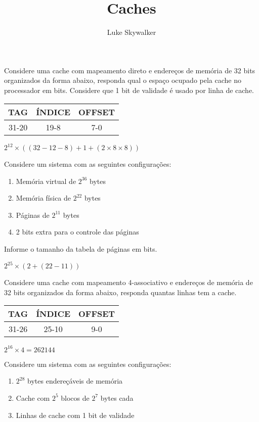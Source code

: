 \documentclass{article}
\author{Luke Skywalker}
\title{Caches}
\begin{document}
\maketitle

Considere uma cache com mapeamento direto e endereços de memória de 32 bits 
organizados da forma abaixo, responda qual o espaço ocupado pela cache no 
processador em bits. Considere que 1 bit de validade é usado por linha de cache.

\begin{tabular}{|c|c|c|}
\hline TAG & ÍNDICE & OFFSET \\
\hline 31-20 & 19-8 & 7-0 \\
\hline
\end{tabular}

$2^{12}\times((32-12-8)+1+(2\times8\times8))$

Considere um sistema com as seguintes configurações:

\begin{enumerate}
\item Memória virtual de $2^36$ bytes
\item Memória física de $2^22$ bytes
\item Páginas de $2^11$ bytes
\item 2 bits extra para o controle das páginas
\end{enumerate}

Informe o tamanho da tabela de páginas em bits.

$2^{25}\times(2+(22-11))$

Considere uma cache com mapeamento 4-associativo e endereços de memória de 32 
bits organizados da forma abaixo, responda quantas linhas tem a cache.

\begin{tabular}{|c|c|c|}
\hline TAG & ÍNDICE & OFFSET \\
\hline 31-26 & 25-10 & 9-0 \\
\hline
\end{tabular}

$2^16 \times 4 = 262144$

Considere um sistema com as seguintes configurações:

\begin{enumerate}
\item $2^28$ bytes endereçáveis de memória
\item Cache com $2^5$ blocos de $2^7$ bytes cada
\item Linhas de cache com 1 bit de validade
\end{enumerate}
\end{document}
